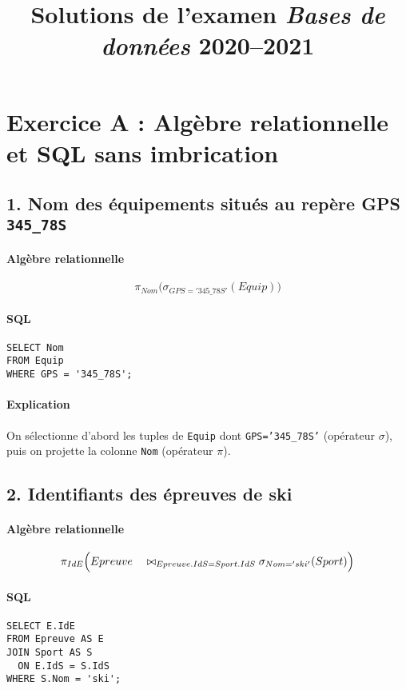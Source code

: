 \documentclass[a4paper,12pt]{article}
\title{Solutions de l'examen \textit{Bases de données} 2020--2021}
\author{}
\date{}
\begin{document}
\maketitle

\section*{Exercice A : Algèbre relationnelle et SQL sans imbrication}

\subsection*{1. Nom des équipements situés au repère GPS \texttt{345\_78S}}
\paragraph{Algèbre relationnelle}
\[
  \pi_{Nom}\bigl(\sigma_{GPS='345\_78S'}(Equip)\bigr)
\]
\paragraph{SQL}
\begin{verbatim}
SELECT Nom
FROM Equip
WHERE GPS = '345_78S';
\end{verbatim}
\paragraph{Explication}
On sélectionne d'abord les tuples de \texttt{Equip} dont \texttt{GPS='345\_78S'} (opérateur \(\sigma\)), puis on projette la colonne \texttt{Nom} (opérateur \(\pi\)).

\subsection*{2. Identifiants des épreuves de ski}
\paragraph{Algèbre relationnelle}
\[
  \pi_{IdE}\Bigl(Epreuve \\
  \quad\bowtie_{Epreuve.IdS = Sport.IdS}  \sigma_{Nom='ski'}(Sport)\Bigr)
\]
\paragraph{SQL}
\begin{verbatim}
SELECT E.IdE
FROM Epreuve AS E
JOIN Sport AS S
  ON E.IdS = S.IdS
WHERE S.Nom = 'ski';
\end{verbatim}
\end{document}
